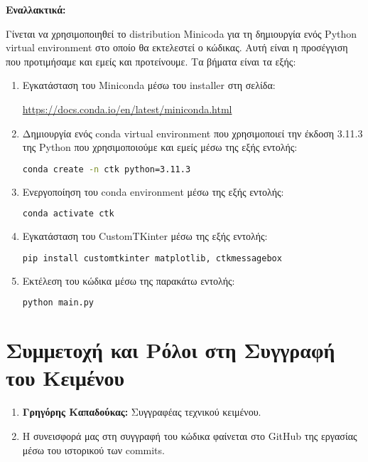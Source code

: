 \documentclass[12pt,a4paper]{article}
\begin{document}
\textbf{Εναλλακτικά:}

Γίνεται να χρησιμοποιηθεί το distribution Minicoda για τη δημιουργία ενός Python virtual environment στο οποίο θα εκτελεστεί ο κώδικας. Αυτή είναι η προσέγγιση που προτιμήσαμε και εμείς και προτείνουμε. Τα βήματα είναι τα εξής:

\begin{enumerate}
    \item Εγκατάσταση του Miniconda μέσω του installer στη σελίδα:

        \textcolor{blue}{\href{https://docs.conda.io/en/latest/miniconda.html}{https://docs.conda.io/en/latest/miniconda.html}}
    \item Δημιουργία ενός conda virtual environment που χρησιμοποιεί την έκδοση 3.11.3 της Python που χρησιμοποιούμε και εμείς μέσω της εξής εντολής:

\begin{lstlisting}[language=Bash]
conda create -n ctk python=3.11.3\end{lstlisting}

    \item Ενεργοποίηση του conda environment μέσω της εξής εντολής:

\begin{lstlisting}[language=Bash]
conda activate ctk\end{lstlisting}

    \item Εγκατάσταση του CustomTKinter μέσω της εξής εντολής:

\begin{lstlisting}[language=Bash]
pip install customtkinter matplotlib, ctkmessagebox\end{lstlisting}

    \item Εκτέλεση του κώδικα μέσω της παρακάτω εντολής:
\begin{lstlisting}[language=Bash]
python main.py\end{lstlisting}

\end{enumerate}

\section{Συμμετοχή και Ρόλοι στη Συγγραφή του Κειμένου}
\begin{enumerate}
	\item \textbf{Γρηγόρης Καπαδούκας:} Συγγραφέας τεχνικού κειμένου.
    \item Η συνεισφορά μας στη συγγραφή του κώδικα φαίνεται στο GitHub της εργασίας μέσω του ιστορικού των commits.
\end{enumerate}
\end{document}
